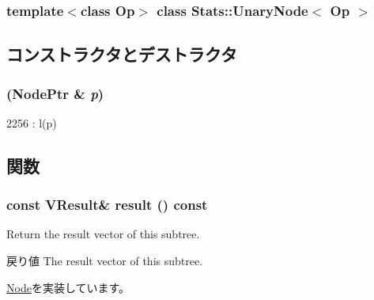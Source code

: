 \subsubsection*{template$<$class Op$>$ class Stats::UnaryNode$<$ Op $>$}



\subsection{コンストラクタとデストラクタ}
\hypertarget{classStats_1_1UnaryNode_abe175a290c9aece53b666c30cda21168}{
\subsubsection[{UnaryNode}]{ ({\bf NodePtr} \& {\em p})}}
\label{classStats_1_1UnaryNode_abe175a290c9aece53b666c30cda21168}



\begin{DoxyCode}
2256 : l(p) {}
\end{DoxyCode}


\subsection{関数}
\hypertarget{classStats_1_1UnaryNode_aba312f9e3431b1652f8b3ddf3fe105dc}{
\subsubsection[{result}]{\setlength{\rightskip}{0pt plus 5cm}const {\bf VResult}\& result () const}}
\label{classStats_1_1UnaryNode_aba312f9e3431b1652f8b3ddf3fe105dc}
Return the result vector of this subtree. \begin{DoxyReturn}{戻り値}
The result vector of this subtree. 
\end{DoxyReturn}


\hyperlink{classStats_1_1Node_a7fcf57115122663db42f39cc18ca0f62}{Node}を実装しています。


